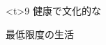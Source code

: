 \documentclass{ltjsarticle}
\begin{document}
    \begin{center}
        \Huge{
            \begin{minipage}
                <t>{9\zw}
                健康で文化的な\par{}\hspace{2.0\zw}最低限度の生活
            \end{minipage}}
    \end{center}
\end{document}

